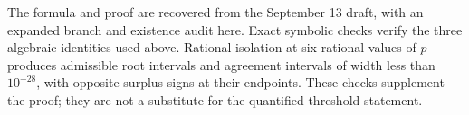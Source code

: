 The formula and proof are recovered from the September 13 draft, with
an expanded branch and existence audit here. Exact symbolic checks
verify the three algebraic identities used above. Rational isolation
at six rational values of $p$ produces admissible root intervals and
agreement intervals of width less than $10^{-28}$, with opposite
surplus signs at their endpoints. These checks supplement the proof;
they are not a substitute for the quantified threshold statement.
